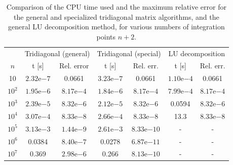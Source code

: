\documentclass[a4paper,english]{article}
\begin{document}
\begin{table}[ht]
  \centering
  \begin{tabular}{c c c c c c c} \toprule
    & \multicolumn{2}{c}{Tridiagonal (general)} & \multicolumn{2}{c}{Tridiagonal (special)} & \multicolumn{2}{c}{LU decomposition}\\\cmidrule(lr){2-3} \cmidrule(lr){4-5} \cmidrule(lr){6-7}
    $n$ & t [s] & Rel. error & t [s] & Rel. err. & t [s] & Rel. err. \\\midrule
    10 & $2.32\mathrm{e}{-7}$ & 0.0661 & $3.23\mathrm{e}{-7}$ & 0.0661 & $1.10\mathrm{e}{-4}$ & 0.0661 \\
    $10^2$ & $1.95\mathrm{e}{-6}$ & $8.17\mathrm{e}{-4}$ & $1.84\mathrm{e}{-6}$ & $8.17\mathrm{e}{-4}$ & $7.99\mathrm{e}{-4}$ & $8.17\mathrm{e}{-4}$ \\
    $10^3$ & $2.39\mathrm{e}{-5}$ & $8.32\mathrm{e}{-6}$ & $2.12\mathrm{e}{-5}$ & $8.32\mathrm{e}{-6}$ & 0.0594 & $8.32\mathrm{e}{-6}$ \\
    $10^4$ & $3.07\mathrm{e}{-4}$ & $8.33\mathrm{e}{-8}$ & $2.66\mathrm{e}{-4}$ & $8.33\mathrm{e}{-8}$ & 13.3 & $8.33\mathrm{e}{-8}$ \\
    $10^5$ & $3.13\mathrm{e}{-3}$ & $1.44\mathrm{e}{-9}$ & $2.61\mathrm{e}{-3}$ & $8.33\mathrm{e}{-10}$ & - & - \\
    $10^6$ & 0.0384 & $8.40 \mathrm{e}{-7}$ & 0.0278 & $6.87 \mathrm{e}{-11}$ & - & - \\
    $10^7$ & 0.369 & $2.98 \mathrm{e}{-6}$ & 0.266 & $8.13 \mathrm{e}{-10}$ & - & - \\\bottomrule
  \end{tabular}
  \caption{Comparison of the CPU time used and the maximum relative error for the general and specialized tridiagonal matrix algorithms, and the general LU decomposition method, for various numbers of integration points $n+2$.}
  \label{tab:mainresults}
\end{table}
\end{document}
